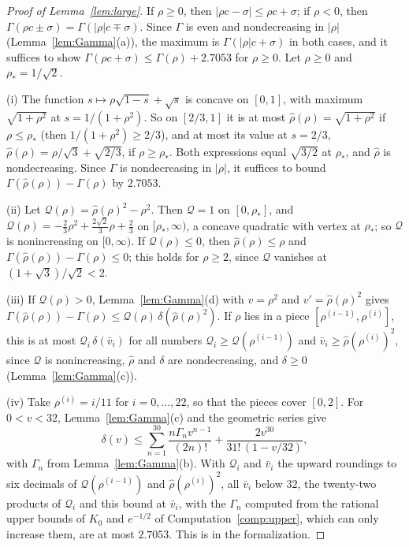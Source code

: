 \documentclass[12pt]{amsart}
\theoremstyle{definition}
\numberwithin{equation}{section}
\begin{document}
\begin{proof}[Proof of Lemma~\ref{lem:large}]
If $\rho\ge0$, then $|\rho c-\sigma|\le\rho c+\sigma$; if $\rho<0$, then $\Gamma(\rho c\pm\sigma)=\Gamma(|\rho|c\mp\sigma)$. Since $\Gamma$ is even and nondecreasing in $|\rho|$ (Lemma~\ref{lem:Gamma}(a)), the maximum is $\Gamma(|\rho|c+\sigma)$ in both cases, and it suffices to show $\Gamma(\rho c+\sigma)\le\Gamma(\rho)+2.7053$ for $\rho\ge0$. Let $\rho\ge0$ and $\rho_*=1/\sqrt2$.

(i) The function $s\mapsto\rho\sqrt{1-s}+\sqrt s$ is concave on $[0,1]$, with maximum $\sqrt{1+\rho^2}$ at $s=1/(1+\rho^2)$. So on $[2/3,1]$ it is at most $\hat\rho(\rho)=\sqrt{1+\rho^2}$ if $\rho\le\rho_*$ (then $1/(1+\rho^2)\ge2/3$), and at most its value at $s=2/3$, $\hat\rho(\rho)=\rho/\sqrt3+\sqrt{2/3}$, if $\rho\ge\rho_*$. Both expressions equal $\sqrt{3/2}$ at $\rho_*$, and $\hat\rho$ is nondecreasing. Since $\Gamma$ is nondecreasing in $|\rho|$, it suffices to bound $\Gamma(\hat\rho(\rho))-\Gamma(\rho)$ by $2.7053$.

(ii) Let $\mathcal Q(\rho)=\hat\rho(\rho)^2-\rho^2$. Then $\mathcal Q=1$ on $[0,\rho_*]$, and $\mathcal Q(\rho)=-\frac23\rho^2+\frac{2\sqrt2}3\rho+\frac23$ on $[\rho_*,\infty)$, a concave quadratic with vertex at $\rho_*$; so $\mathcal Q$ is nonincreasing on $[0,\infty)$. If $\mathcal Q(\rho)\le0$, then $\hat\rho(\rho)\le\rho$ and $\Gamma(\hat\rho(\rho))-\Gamma(\rho)\le0$; this holds for $\rho\ge2$, since $\mathcal Q$ vanishes at $(1+\sqrt3)/\sqrt2<2$.

(iii) If $\mathcal Q(\rho)>0$, Lemma~\ref{lem:Gamma}(d) with $v=\rho^2$ and $v'=\hat\rho(\rho)^2$ gives $\Gamma(\hat\rho(\rho))-\Gamma(\rho)\le \mathcal Q(\rho)\,\delta(\hat\rho(\rho)^2)$. If $\rho$ lies in a piece $[\rho^{(i-1)},\rho^{(i)}]$, this is at most $\mathcal Q_i\,\delta(\bar v_i)$ for all numbers $\mathcal Q_i\ge \mathcal Q(\rho^{(i-1)})$ and $\bar v_i\ge \hat\rho(\rho^{(i)})^2$, since $\mathcal Q$ is nonincreasing, $\hat\rho$ and $\delta$ are nondecreasing, and $\delta\ge0$ (Lemma~\ref{lem:Gamma}(c)).

(iv) Take $\rho^{(i)}=i/11$ for $i=0,\dots,22$, so that the pieces cover $[0,2]$. For $0<v<32$, Lemma~\ref{lem:Gamma}(c) and the geometric series give
\[
\delta(v)\le\sum_{n=1}^{30}\frac{n\Gamma_nv^{n-1}}{(2n)!}+\frac{2v^{30}}{31!\,(1-v/32)},
\]
with $\Gamma_n$ from Lemma~\ref{lem:Gamma}(b). With $\mathcal Q_i$ and $\bar v_i$ the upward roundings to six decimals of $\mathcal Q(\rho^{(i-1)})$ and $\hat\rho(\rho^{(i)})^2$, all $\bar v_i$ below $32$, the twenty-two products of $\mathcal Q_i$ and this bound at $\bar v_i$, with the $\Gamma_n$ computed from the rational upper bounds of $K_0$ and $e^{-1/2}$ of Computation~\ref{comp:upper}, which can only increase them, are at most $2.7053$. This is  in the formalization.
\end{proof}
\end{document}
